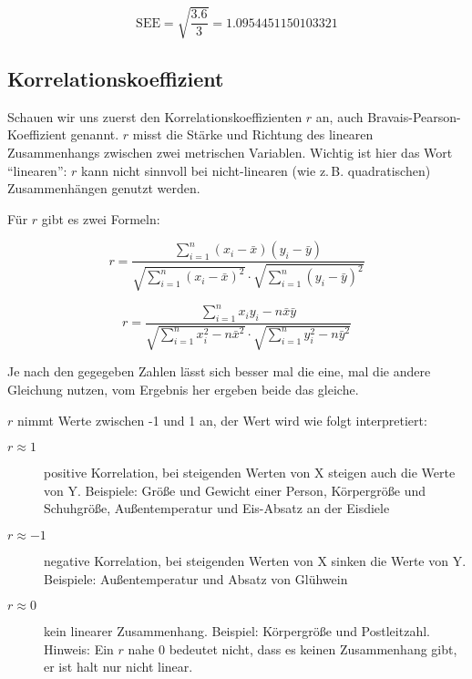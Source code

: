 \documentclass[ngerman, 12pt]{scrartcl}
\begin{document}
\begin{equation}
\text{SEE} = \sqrt{\frac{3.6}{3}} = 1.0954451150103321
\end{equation}



\subsection{Korrelationskoeffizient}

Schauen wir uns zuerst den Korrelationskoeffizienten \(r\) an, auch Bravais-Pearson-Koeffizient  genannt. \(r\) misst die Stärke und Richtung des linearen Zusammenhangs zwischen zwei metrischen Variablen. Wichtig ist hier das Wort \enquote{linearen}: \(r\) kann nicht sinnvoll bei nicht-linearen (wie z.\,B. quadratischen) Zusammenhängen genutzt werden.

Für \(r\) gibt es zwei Formeln:

\begin{equation}
r = \frac{\sum_{i=1}^n (x_i - \bar{x})(y_i - \bar{y})}%
{ \sqrt{\sum_{i=1}^n (x_i - \bar{x})^2}  \cdot \sqrt{\sum_{i=1}^n (y_i - \bar{y})^2}}
\end{equation}

\begin{equation}
r = \frac{\sum_{i=1}^n x_iy_i - n\bar{x}\bar{y}}%
{\sqrt{\sum_{i=1}^n x_i^2 - n\bar{x}^2}\cdot \sqrt{\sum_{i=1}^n y_i^2 - n\bar{y}^2}}
\end{equation}

Je nach den gegegeben Zahlen lässt sich besser mal die eine, mal die andere Gleichung nutzen, vom Ergebnis her ergeben beide das gleiche.

\(r\) nimmt Werte zwischen -1 und 1 an, der Wert wird wie folgt interpretiert:

\begin{description}
\item [\(r \approx 1\)] positive Korrelation, bei steigenden Werten von X steigen auch die Werte von Y. Beispiele: Größe und Gewicht einer Person, Körpergröße und Schuhgröße, Außentemperatur und Eis-Absatz an der Eisdiele
\item [\(r \approx -1\)] negative Korrelation, bei steigenden Werten von X sinken die Werte von Y. Beispiele: Außentemperatur und Absatz von Glühwein
\item [\(r \approx 0\)] kein linearer Zusammenhang. Beispiel: Körpergröße und Postleitzahl. Hinweis: Ein \(r\) nahe 0 bedeutet nicht, dass es keinen Zusammenhang gibt, er ist halt nur nicht linear. 
\end{description}
\end{document}
